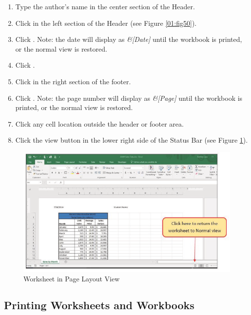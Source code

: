 \begin{enumerate}[resume]
	\item Type the author's name in the center section of the Header.
	\item Click in the left section of the Header (see Figure \ref{01:fig50}).
	\item Click . Note: the date will display as \textit{\&[Date]} until the workbook is printed, or the normal view is restored.
	\item Click .
	\item Click in the right section of the footer.
	\item Click . Note: the page number will display as \textit{\&[Page]} until the workbook is printed, or the normal view is restored.
	\item Click any cell location outside the header or footer area.
	\item Click the  view button in the lower right side of the Status Bar (see Figure \ref{01:fig51}).

\end{enumerate}

\begin{figure}[H]
	\centering
	\includegraphics[width=\maxwidth{.95\linewidth}]{gfx/ch01_fig51}
	\caption{Worksheet in Page Layout View}
	\label{01:fig51}
\end{figure}

\subsection{Printing Worksheets and Workbooks}

